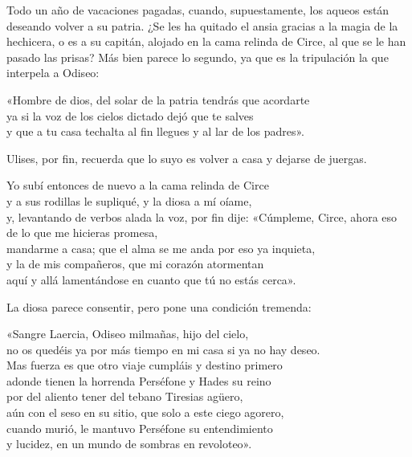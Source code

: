 \label{cap:voz}

Todo un año de vacaciones pagadas, cuando, supuestamente, los aqueos están deseando volver a su patria. ¿Se les ha quitado el ansia gracias a la magia de la hechicera, o es a su capitán, alojado en la cama relinda de Circe, al que se le han pasado las prisas? Más bien parece lo segundo, ya que es la tripulación la que interpela a Odiseo:

\begin{versocita}
«Hombre de dios, del solar de la patria tendrás que acordarte\\
ya si la voz de los cielos dictado dejó que te salves\\
y que a tu casa techalta al fin llegues y al lar de los padres».
\end{versocita}

Ulises, por fin, recuerda que lo suyo es volver a casa y dejarse de juergas.

\begin{versocita}
Yo subí entonces de nuevo a la cama relinda de Circe\\
y a sus rodillas le supliqué, y la diosa a mí oíame,\\
y, levantando de verbos alada la voz, por fin dije:
\stanzabreak
«Cúmpleme, Circe, ahora eso de lo que me hicieras promesa,\\
mandarme a casa; que el alma se me anda por eso ya inquieta,\\
y la de mis compañeros, que mi corazón atormentan\\
aquí y allá lamentándose en cuanto que tú no estás cerca».
\end{versocita}

La diosa parece consentir, pero pone una condición tremenda:

\begin{versocita}
«Sangre Laercia, Odiseo milmañas, hijo del cielo,\\
no os quedéis ya por más tiempo en mi casa si ya no hay deseo.\\
Mas fuerza es que otro viaje cumpláis y destino primero\\
adonde tienen la horrenda Perséfone y Hades su reino\\
por del aliento tener del tebano Tiresias agüero,\\
aún con el seso en su sitio, que solo a este ciego agorero,\\
cuando murió, le mantuvo Perséfone su entendimiento\\
y lucidez, en un mundo de sombras en revoloteo».
\end{versocita}

